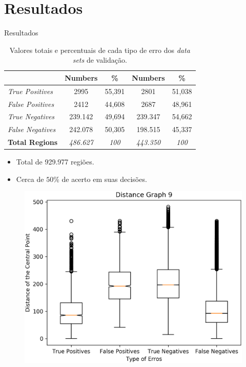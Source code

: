 \documentclass[aspectratio=169, xcolor=dvipsnames]{beamer}
\let\olditem=\item%
\renewcommand{\item}{\olditem \justifying}
\begin{document}
\section{Resultados}
	\begin{frame}{Resultados}
		\begin{table}[H]
			\centering
			\caption{Valores totais e percentuais de cada tipo de erro dos \textit{data sets} de validação.}
			\label{tab:erros}
			\begin{tabular}{|l|c|c||c|c|}
				\hline
				& \textbf{Numbers} & \textbf{\%}     & \textbf{Numbers} & \textbf{\%}     \\ \hline
				\textit{True Positives}  & 2995    & 55,391 & 2801    & 51,038 \\ \hline
				\textit{False Positives} & 2412    & 44,608 & 2687    & 48,961 \\ \hline \hline
				\textit{True Negatives}  & 239.142 & 49,694 & 239.347 & 54,662 \\ \hline
				\textit{False Negatives} & 242.078 & 50,305 & 198.515 & 45,337 \\ \hline \hline \hline
				\textbf{Total Regions}   & \textit{486.627} & \textit{100}    & \textit{443.350} & \textit{100}    \\ \hline
			\end{tabular}
		\end{table}
		\begin{itemize}
			\setlength\itemsep{1em}
			\item Total de 929.977 regiões.
			
			\item Cerca de $ 50\% $ de acerto em suas decisões.
		\end{itemize}
	\end{frame}
	\begin{frame}
		\begin{figure}[h]
			\centering
			\includegraphics[width=0.7\linewidth]{img/boxplot-9.png}
			\label{fig:bp-9}
		\end{figure}
	\end{frame}
\end{document}
